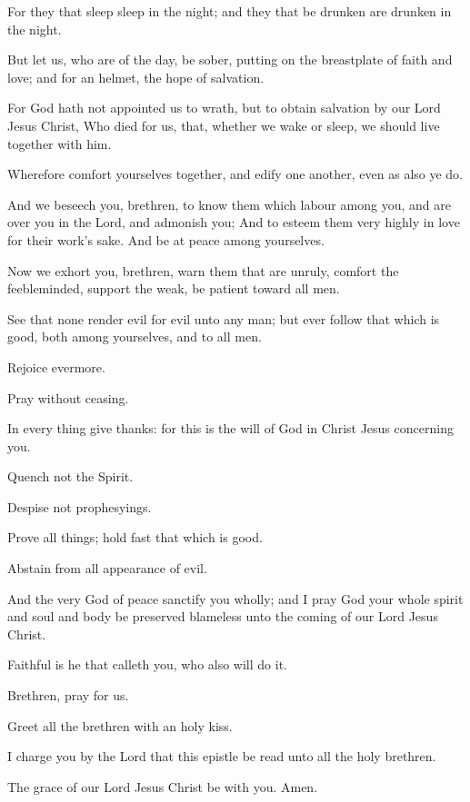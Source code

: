 \verse For they that sleep sleep in the night; and they that be drunken are drunken in the night.

\verse But let us, who are of the day, be sober, putting on the breastplate of faith and love; and for an helmet, the hope of salvation.

\verse For God hath not appointed us to wrath, but to obtain salvation by our Lord Jesus Christ, \verse Who died for us, that, whether we wake or sleep, we should live together with him.

\verse Wherefore comfort yourselves together, and edify one another, even as also ye do.

\verse And we beseech you, brethren, to know them which labour among you, and are over you in the Lord, and admonish you; \verse And to esteem them very highly in love for their work's sake. And be at peace among yourselves.

\verse Now we exhort you, brethren, warn them that are unruly, comfort the feebleminded, support the weak, be patient toward all men.

\verse See that none render evil for evil unto any man; but ever follow that which is good, both among yourselves, and to all men.

\verse Rejoice evermore.

\verse Pray without ceasing.

\verse In every thing give thanks: for this is the will of God in Christ Jesus concerning you.

\verse Quench not the Spirit.

\verse Despise not prophesyings.

\verse Prove all things; hold fast that which is good.

\verse Abstain from all appearance of evil.

\verse And the very God of peace sanctify you wholly; and I pray God your whole spirit and soul and body be preserved blameless unto the coming of our Lord Jesus Christ.

\verse Faithful is he that calleth you, who also will do it.

\verse Brethren, pray for us.

\verse Greet all the brethren with an holy kiss.

\verse I charge you by the Lord that this epistle be read unto all the holy brethren.

\verse The grace of our Lord Jesus Christ be with you. Amen.

